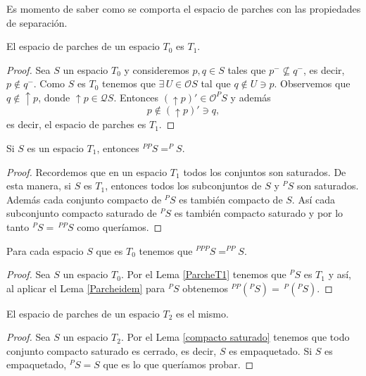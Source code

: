 Es momento de saber como se comporta el espacio de parches con las propiedades de separación.

\begin{lem}\label{ParcheT1}
    El espacio de parches de un espacio $T_0$ es $T_1$.
\end{lem}

\begin{proof}
    Sea $S$ un espacio $T_0$ y consideremos $p, q\in S$ tales que $p^-\nsubseteq q^-$, es decir, $p\notin q^-$. Como $S$ es $T_0$ tenemos que $\exists \,U\in \mathcal{O}S$ tal que $q\notin U\ni p$. Observemos que $q\notin \uparrow p$, donde $\uparrow p\in \mathcal{Q}S$. Entonces $(\uparrow p)'\in \mathcal{O}^PS$ y además 
    \[
    p \notin (\uparrow p)'\ni q,
    \]
    es decir, el espacio de parches es $T_1$.
\end{proof}

\begin{lem}\label{Parcheidem}
    Si $S$ es un espacio $T_1$, entonces $^{PP}S=^PS$.
\end{lem}

\begin{proof}
    Recordemos que en un espacio $T_1$ todos los conjuntos son saturados. De esta manera, si $S$ es $T_1$, entonces todos los subconjuntos de $S$ y $^PS$ son saturados. Además cada conjunto compacto de $^PS$ es también compacto de $S$. Así cada subconjunto compacto saturado de $^PS$ es también compacto saturado y por lo tanto $^PS=\,^{PP}S$ como queríamos.  
\end{proof}

\begin{cor}
    Para cada espacio $S$ que es $T_0$ tenemos que $^{PPP}S=^{PP}S$.
\end{cor}

\begin{proof}
    Sea $S$ un espacio $T_0$. Por el Lema \ref{ParcheT1} tenemos que $^PS$ es $T_1$ y así, al aplicar el Lema \ref{Parcheidem} para $^PS$ obtenemos $^{PP}(^PS)=\,^P(^PS)$.
\end{proof}

\begin{lem}\label{ParcheT2}
    El espacio de parches de un espacio $T_2$ es el mismo.
\end{lem}

\begin{proof}
    Sea $S$ un espacio $T_2$. Por el Lema \ref{compacto saturado} tenemos que todo conjunto compacto saturado es cerrado, es decir, $S$ es empaquetado. Si $S$ es empaquetado, $^PS=S$ que es lo que queríamos probar.
\end{proof}

